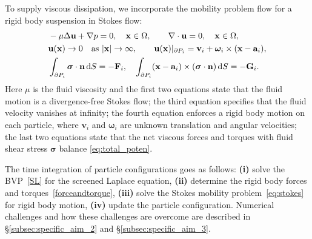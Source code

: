 To supply viscous dissipation, we incorporate the mobility problem
flow for a rigid body suspension in Stokes flow:
\begin{equation}
\label{eq:stokes}
\begin{aligned}
  &-\mu \Delta \mathbf{u} + \nabla p = 0, \quad \mathbf{x} \in \Omega, \qquad 
  \nabla \cdot \mathbf{u} = 0,  \quad \mathbf{x} \in \Omega,\\
  &{\bf u}(\mathbf{x}) \to 0 \quad \text{as}\ |\mathbf{x}|\to \infty,\qquad 
  \mathbf{u}(\mathbf{x})|_{\partial P_i} = \mathbf{v}_i +
\boldsymbol{\omega}_i\times(\mathbf{x} - \mathbf{a}_i),\\
&\int_{\partial P_i}\boldsymbol{\sigma}\cdot {\bf n} \dif S=-{\bf F}_i, \quad
\int_{\partial P_i} (\mathbf{x} - \mathbf{a}_i)\times (\boldsymbol{\sigma} \cdot \mathbf{n}) \dif S =-{\bf G}_i.
\end{aligned}
\end{equation}
Here $\mu$ is the fluid viscosity and the first two equations state that
the fluid motion is a divergence-free Stokes flow; the third equation
specifies that the fluid velocity vanishes at infinity; the fourth
equation enforces a rigid body motion on each particle, where
$\mathbf{v}_i$ and $\boldsymbol{\omega}_i$ are unknown translation and
angular velocities; the last two equations state that the net
viscous forces and torques with fluid shear stress $\boldsymbol{\sigma}$
balance \eqref{eq:total_poten}.



The time integration of
particle configurations goes as follows: \textbf{(i)} solve the
BVP~\eqref{SL} for the screened Laplace equation, \textbf{(ii)}
determine the rigid body forces and torques~\eqref{forceandtorque},
\textbf{(iii)} solve the Stokes mobility problem~\eqref{eq:stokes} for
rigid body motion, \textbf{(iv)} update the particle configuration.
Numerical challenges and how these challenges are overcome are described
in \S\ref{subsec:specific_aim_2} and \S\ref{subsec:specific_aim_3}.


